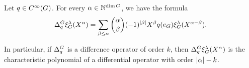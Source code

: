 \begin{lemma}
\label{lemma:difference_operators_on_characteristic_polynomials}
    Let $q \in {C^\infty(G)}$.
    For every $\alpha \in \mathbb{N}^{\dim G}$,
    we have the formula
    \begin{align*}
        \DifferenceOperator q \Rep \lambda(\LeftDifferentialOperator \alpha)
        =
        \sum_{\beta \leq \alpha} \binom \alpha \beta
        (-1)^{\abs \beta}
        \LeftDifferentialOperator \beta q(e_\Group)
        \Rep \lambda(\LeftDifferentialOperator {\alpha - \beta}).
    \end{align*}

    In particular,
    if ${\Delta^{G}_{q}}$ is a difference operator of order $k$,
    then $\DifferenceOperator q \Rep \lambda(\LeftDifferentialOperator \alpha)$ is the characteristic polynomial of a differential operator with order $\left|{\alpha}\right| - k$.
\end{lemma}
